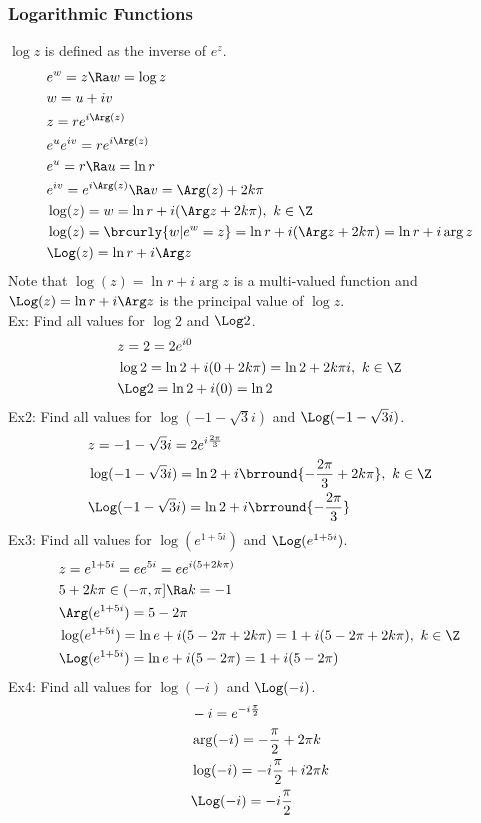 \subsubsection{Logarithmic Functions}
$\log z$ is defined as the inverse of $e^z$.
\begin{align*}
    &e^w=z\Ra w=\log z\\
    &w=u+iv\\
    &z=re^{i\Arg(z)}\\
    &e^ue^{iv}=re^{i\Arg(z)}\\
    &e^u=r\Ra u=\ln r\\
    &e^{iv}=e^{i\Arg(z)}\Ra v=\Arg(z)+2k\pi\\
    &\log(z)=w=\ln r+i(\Arg z+2k\pi),\ k\in\Z\\
    &\log(z)=\brcurly{w|e^w=z}=\ln r+i(\Arg z+2k\pi)=\ln r+i\arg z\\
    &\Log(z)=\ln r+i\Arg z
\end{align*}
Note that $\log(z)=\ln r+i\arg z$ is a multi-valued function and $\Log(z)=\ln r+i\Arg z$ is the principal value of $\log z$.\\
Ex: Find all values for $\log 2$ and $\Log 2$.
\begin{align*}
    &z=2=2e^{i0}\\
    &\log 2=\ln 2+i(0+2k\pi)=\ln 2+2k\pi i,\ k\in\Z\\
    &\Log 2=\ln 2+i(0)=\ln 2
\end{align*}
Ex2: Find all values for $\log(-1-\sqrt{3}i)$ and $\Log(-1-\sqrt{3}i)$.
\begin{align*}
    &z=-1-\sqrt{3}i=2e^{i\frac{2\pi}{3}}\\
    &\log(-1-\sqrt{3}i)=\ln 2+i\brround{-\frac{2\pi}{3}+2k\pi},\ k\in\Z\\
    &\Log(-1-\sqrt{3}i)=\ln 2+i\brround{-\frac{2\pi}{3}}
\end{align*}
Ex3: Find all values for $\log(e^{1+5i})$ and $\Log(e^{1+5i})$.
\begin{align*}
    &z=e^{1+5i}=ee^{5i}=ee^{i(5+2k\pi)}\\
    &5+2k\pi\in(-\pi,\pi]\Ra k=-1\\
    &\Arg(e^{1+5i})=5-2\pi\\
    &\log(e^{1+5i})=\ln e+i(5-2\pi+2k\pi)=1+i(5-2\pi+2k\pi),\ k\in\Z\\
    &\Log(e^{1+5i})=\ln e+i(5-2\pi)=1+i(5-2\pi)
\end{align*}
Ex4: Find all values for $\log(-i)$ and $\Log(-i)$.
\begin{align*}
    &-i=e^{-i\frac{\pi}{2}}\\
    &\arg(-i)=-\frac{\pi}{2}+2\pi k\\
    &\log(-i)=-i\frac{\pi}{2}+i2\pi k\\
    &\Log(-i)=-i\frac{\pi}{2}
\end{align*}

